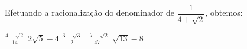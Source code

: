 Efetuando a racionalização do denominador de $\dfrac{1}{4+\sqrt{2}}$, obtemos:

$\frac{4-\sqrt{2}}{14}$
$2\sqrt{5}-4$
$\frac{3+\sqrt{3}}{2}$
$\frac{-7-\sqrt{2}}{47}$
$\sqrt{13}-8$

